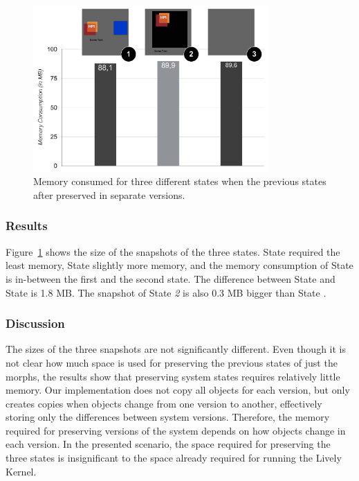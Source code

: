 \begin{figure}[h!]
    \centering
    \includegraphics[width=0.8\textwidth]{figures/6_evaluation/2_memoryForVersions.pdf}
    \caption{Memory consumed for three different states when the previous states after preserved in separate versions.}
    \label{fig:MemoryOverheadForVersions}
\end{figure}

\subsubsection{Results}
Figure~\ref{fig:MemoryOverheadForVersions} shows the size of the snapshots of the three states.
State  required the least memory, State  slightly more memory, and the memory consumption of State  is in-between the first and the second state.
The difference between State  and State  is 1.8 MB.
The snapshot of State \emph{2} is also 0.3 MB bigger than State .

\subsubsection{Discussion}

The sizes of the three snapshots are not significantly different.
Even though it is not clear how much space is used for preserving the previous states of just the morphs, the results show that preserving system states requires relatively little memory.
Our implementation does not copy all objects for each version, but only creates copies when objects change from one version to another, effectively storing only the differences between system versions.
Therefore, the memory required for preserving versions of the system depends on how objects change in each version.
In the presented scenario, the space required for preserving the three states is insignificant to the space already required for running the Lively Kernel.


